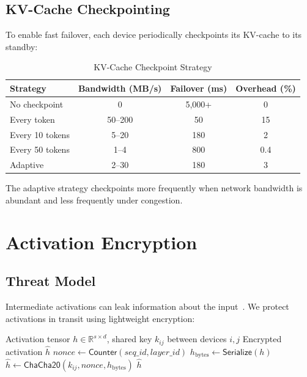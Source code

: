 \documentclass[11pt,a4paper]{article}
\newcommand{\RR}{\mathbb{R}}
\begin{document}
\subsection{KV-Cache Checkpointing}

To enable fast failover, each device periodically checkpoints its KV-cache to its standby:

\begin{table}[H]
\centering
\caption{KV-Cache Checkpoint Strategy}
\label{tab:checkpoint}
\begin{tabular}{lccc}
\toprule
\textbf{Strategy} & \textbf{Bandwidth (MB/s)} & \textbf{Failover (ms)} & \textbf{Overhead (\%)} \\
\midrule
No checkpoint & 0 & 5{,}000+ & 0 \\
Every token & 50--200 & 50 & 15 \\
Every 10 tokens & 5--20 & 180 & 2 \\
Every 50 tokens & 1--4 & 800 & 0.4 \\
Adaptive & 2--30 & 180 & 3 \\
\bottomrule
\end{tabular}
\end{table}

The adaptive strategy checkpoints more frequently when network bandwidth is abundant and less frequently under congestion.

\section{Activation Encryption}

\subsection{Threat Model}

Intermediate activations can leak information about the input~\citep{he2019model}. We protect activations in transit using lightweight encryption:

\begin{algorithm}[H]
\caption{Activation Encryption}
\label{alg:enc-activation}
\begin{algorithmic}[1]
\Require Activation tensor $h \in \RR^{s \times d}$, shared key $k_{ij}$ between devices $i, j$
\Ensure Encrypted activation $\hat{h}$
\State $\mathit{nonce} \leftarrow \mathsf{Counter}(\mathit{seq\_id}, \mathit{layer\_id})$
\State $h_{\text{bytes}} \leftarrow \mathsf{Serialize}(h)$ 
\State $\hat{h} \leftarrow \mathsf{ChaCha20}(k_{ij}, \mathit{nonce}, h_{\text{bytes}})$
\State \Return $\hat{h}$
\end{algorithmic}
\end{algorithm}
\end{document}
